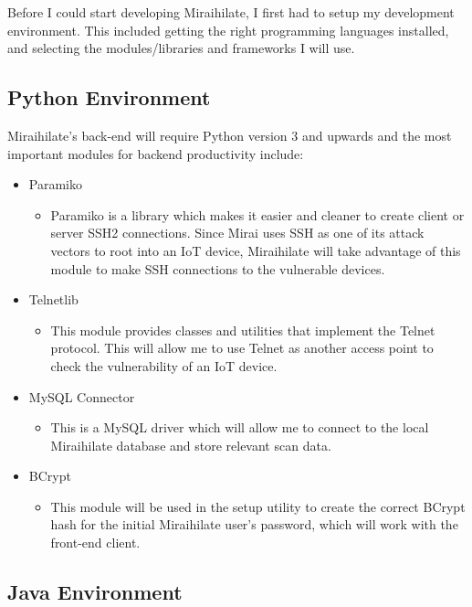 Before I could start developing Miraihilate, I first had to setup my development environment. This included getting the right programming languages installed, and selecting the modules/libraries and frameworks I will use.

\subsection{Python Environment}

Miraihilate's back-end will require Python version 3 and upwards and the most important modules for backend productivity include:

\begin{itemize}
	\item{Paramiko}
	\begin{itemize}
		\item{Paramiko is a library which makes it easier and cleaner to create client or server SSH2 connections. Since Mirai uses SSH as one of its attack vectors to root into an IoT device, Miraihilate will take advantage of this module to make SSH connections to the vulnerable devices.}
	\end{itemize}
	\item{Telnetlib}
	\begin{itemize}
		\item{This module provides classes and utilities that implement the Telnet protocol. This will allow me to use Telnet as another access point to check the vulnerability of an IoT device.}
	\end{itemize}
	\item{MySQL Connector}
	\begin{itemize}
		\item{This is a MySQL driver which will allow me to connect to the local Miraihilate database and store relevant scan data.}
	\end{itemize}
	\item{BCrypt}
	\begin{itemize}
		\item{This module will be used in the setup utility to create the correct BCrypt hash for the initial Miraihilate user's password, which will work with the front-end client.}
	\end{itemize}
\end{itemize}

\subsection{Java Environment}

